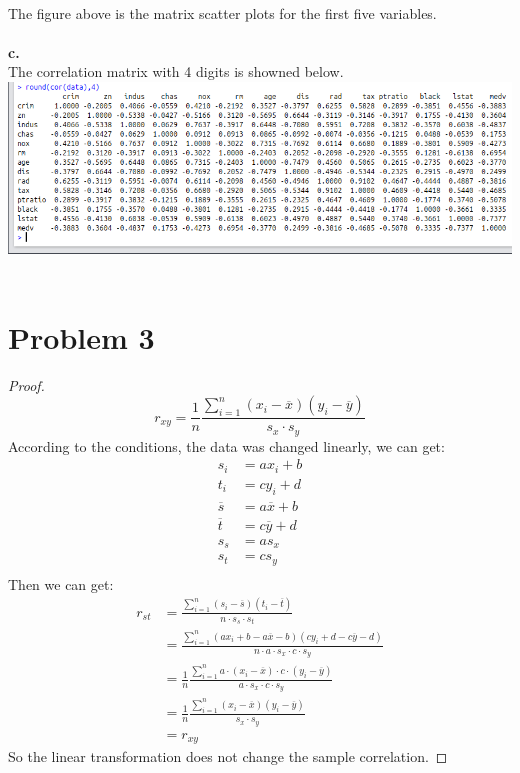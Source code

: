 \message{ !name(hw1.tex)}\documentclass{article}
\begin{document}
~\\
The figure above is the matrix scatter plots for the first five variables.\\
~\\
\clearpage
\textbf{c.}\\
The correlation matrix with 4 digits is showned below.\\
\includegraphics[width=6in]{corre.png}
~\\


\section{Problem 3}
\begin{proof}
\begin{equation*}
  r_{xy} = \frac{1}{n}\frac{\sum_{i=1}^n \left(x_i - \overline{x}\right)\left(y_i - \overline{y}\right)}{s_x \cdot s_y}
\end{equation*}
According to the conditions, the data was changed linearly, we can get:
\begin{align*}
  s_i &= ax_i + b\\
  t_i &= cy_i + d\\
  \overline{s} &= a\overline{x} + b\\
  \overline{t} &= c\overline{y} + d\\
  s_s &= as_x\\
  s_t &= cs_y\\
\end{align*}
Then we can get:
\begin{align*}
  r_{st} &= \frac{\sum_{i=1}^n \left(s_i - \overline{s}\right)\left(t_i - \overline{t}\right)}{n \cdot s_s \cdot s_t}\\
  &= \frac{\sum_{i=1}^n \left(ax_i + b - a\overline{x} - b\right)\left(cy_i + d - c\overline{y} - d\right)}{n \cdot a \cdot s_x \cdot c \cdot s_y}\\
  &=\frac{1}{n}\frac{\sum_{i=1}^n a \cdot \left(x_i - \overline{x}\right) \cdot c \cdot \left(y_i - \overline{y}\right)}{a\cdot s_x \cdot c \cdot s_y}\\
  &=\frac{1}{n}\frac{\sum_{i=1}^n \left(x_i - \overline{x}\right)\left(y_i - \overline{y}\right)}{s_x \cdot s_y}\\
  &=r_{xy}
\end{align*}
So the linear transformation does not change the sample correlation.
\end{proof}
\end{document}

